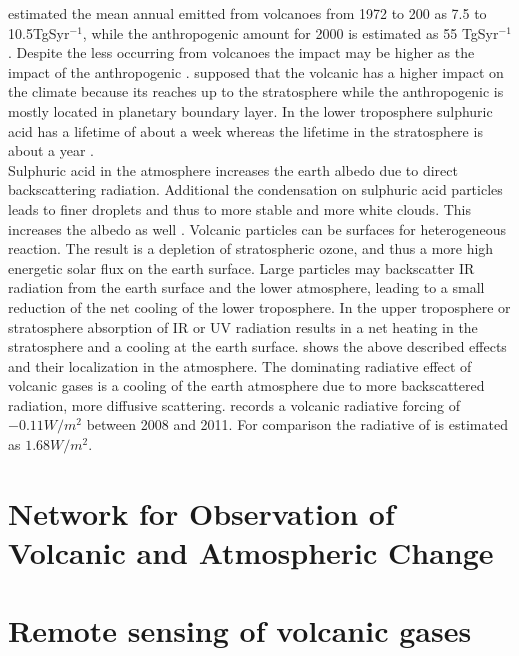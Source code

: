 \documentclass  [
  paper    = a4,
  BCOR     = 10mm,
  twoside,
  fontsize = 12pt,
  fleqn,
  toc      = bibnumbered,
  toc      = listofnumbered,
  numbers  = noendperiod,
  headings = normal,
  listof   = leveldown,
  version  = 3.03
]                                       {scrreprt}
\begin{document}
	\citet{halmer2002annual} estimated the mean annual   emitted from volcanoes from 1972 to 200 as 7.5 to 10.5TgSyr$^{-1}$, while the anthropogenic   amount for 2000 is estimated as 55 TgSyr$^{-1}$ \citep{IPCC}. Despite the less   occurring from volcanoes the impact may be higher as the impact of the anthropogenic . \citet{graf1997volcanic} supposed that the volcanic   has a higher impact on the climate because its reaches up to the stratosphere while the anthropogenic   is mostly located in planetary boundary layer. In the lower troposphere sulphuric acid has a lifetime of about a week whereas the lifetime in the stratosphere is about a year \citep{IPCC}.\\
	Sulphuric acid in the atmosphere increases the earth albedo due to direct backscattering radiation. Additional the condensation on sulphuric acid particles leads to finer droplets and thus to more stable and more white clouds. This increases the albedo as well \citep{twomey1974pollution}.
	Volcanic particles can be surfaces for heterogeneous reaction. The result is a depletion of stratospheric ozone, and thus a more high energetic solar flux on the earth surface.
	Large particles may backscatter IR radiation from the earth surface and the lower atmosphere, leading to a small reduction of the net cooling of the lower troposphere.
	In the upper troposphere or stratosphere absorption of IR or UV radiation results in a net heating in the stratosphere and a cooling at the earth surface.
	 shows the above described effects and their localization in the atmosphere.
	The dominating radiative effect of volcanic gases is a cooling of the earth atmosphere due to  more backscattered radiation, more diffusive scattering\citep{robock2000volcanic}.
	\citet{IPCC} records a volcanic radiative forcing of $-0.11W/m^{2}$ between 2008 and 2011. For comparison the radiative of   is estimated as  $1.68W/m^{2}$.
	
	\chapter{Network for Observation of Volcanic and Atmospheric Change \label{NOVAC}}
%	
	
%
	\chapter{Remote sensing of volcanic gases}
\end{document}
